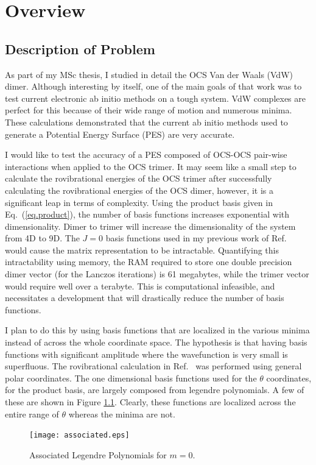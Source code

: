 \chapter{Overview}\label{ch:Meat}

\section{Description of Problem}
As part of my MSc thesis, I studied in detail the OCS Van der Waals (VdW) dimer. Although interesting by itself, one of the main goals of that work was to test 
current electronic ab initio methods on a tough system. VdW complexes are perfect for this because of 
their wide range of motion and numerous minima. These calculations demonstrated that the current ab 
initio methods used to generate a Potential Energy Surface (PES) are very accurate. 

I would like to test the accuracy of a PES composed of OCS-OCS pair-wise interactions when applied to 
the OCS trimer. It may seem like a small step to calculate the rovibrational energies of the 
OCS trimer after successfully calculating the rovibrational energies of
the OCS dimer, however, it is a significant leap in
terms of complexity. Using the product basis given in Eq.~(\ref{eq.product}), the number of basis functions increases exponential with dimensionality. Dimer to trimer will increase the  
dimensionality of the system from 4D to 9D. The $J=0$ basis functions used in my previous work of 
Ref.~ would cause the matrix representation to be intractable. Quantifying this intractability 
using memory, the RAM required to store one double precision dimer vector (for the Lanczos iterations) 
is 61 megabytes, while the trimer vector would require well over a terabyte. This is computational 
infeasible, and necessitates a development that will drastically reduce the number of basis functions.

I plan to do this by using basis functions that are localized in the various minima 
instead of across the whole coordinate space. The hypothesis is that having basis functions with 
significant amplitude where the wavefunction is very small is superfluous. The rovibrational calculation in Ref.~ was performed using general polar coordinates.  The one dimensional basis functions used for the $\theta$ coordinates, for the product basis, are largely composed from legendre polynomials.  A few of these are shown in Figure \ref{fig.ass}.  Clearly, these functions are localized across the entire range of $\theta$ whereas the minima are not.
\begin{figure}[!ht]
\begin{center}
\texttt{[image: associated.eps]}
\caption{Associated Legendre Polynomials for $m=0$.}
\label{fig.ass}
\end{center}
\end{figure}

